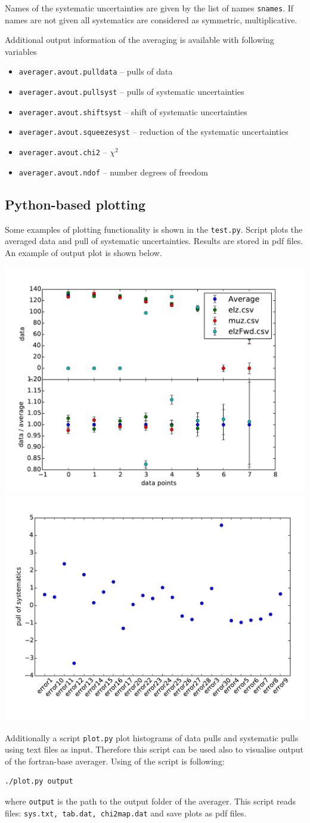 Names of the systematic uncertainties are given by the list of names {\tt snames}. If names are not given all systematics are considered as symmetric, multiplicative.

Additional output information of the averaging is available with following variables

\begin{itemize}
\item {\tt averager.avout.pulldata} -- pulls of data
\item {\tt averager.avout.pullsyst} -- pulls of systematic uncertainties
\item {\tt averager.avout.shiftsyst} -- shift of systematic uncertainties
\item {\tt averager.avout.squeezesyst} -- reduction of the systematic uncertainties
\item {\tt averager.avout.chi2} -- $\chi^2$
\item {\tt averager.avout.ndof} -- number degrees of freedom
\end{itemize}

\subsection{Python-based plotting}
\label{Sec:PythonPlotting}

Some examples of plotting functionality is shown in the {\tt test.py}. Script plots the averaged data and pull of systematic uncertainties. Results are stored in pdf files. An example of output plot is shown below.

\includegraphics[width=0.49\linewidth]{figures/AvData.pdf}
\includegraphics[width=0.49\linewidth]{figures/AvPull.pdf}

Additionally a script {\tt plot.py} plot histograms of data pulls and systematic pulls using text files as input. Therefore this script can be used also to visualise output of the fortran-base averager. Using of the script is following: 

\begin{verbatim}
./plot.py output
\end{verbatim}

where {\tt output} is the path to the output folder of the averager. This script reads files: {\tt sys.txt, tab.dat, chi2map.dat} and save plots as pdf files.
